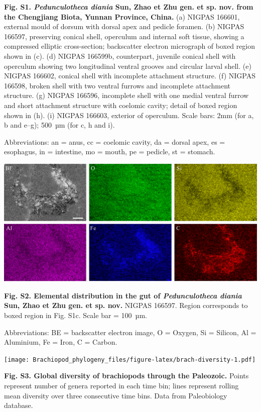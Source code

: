 \documentclass[openany]{book}
\begin{document}
\textbf{Fig. S1. \emph{Pedunculotheca diania} Sun, Zhao et Zhu gen. et
sp. nov. from the Chengjiang Biota, Yunnan Province, China.} (a) NIGPAS
166601, external mould of dorsum with dorsal apex and pedicle foramen.
(b) NIGPAS 166597, preserving conical shell, operculum and internal soft
tissue, showing a compressed elliptic cross-section; backscatter
electron micrograph of boxed region shown in (c). (d) NIGPAS 166599b,
counterpart, juvenile conical shell with operculum showing two
longitudinal ventral grooves and circular larval shell. (e) NIGPAS
166602, conical shell with incomplete attachment structure. (f) NIGPAS
166598, broken shell with two ventral furrows and incomplete attachment
structure. (g) NIGPAS 166596, incomplete shell with one medial ventral
furrow and short attachment structure with coelomic cavity; detail of
boxed region shown in (h). (i) NIGPAS 166603, exterior of operculum.
Scale bars: 2mm (for a, b and e--g); 500~µm (for c, h and i).

Abbreviations: an = anus, cc = coelomic cavity, da = dorsal apex, es =
esophagus, in = intestine, mo = mouth, pe = pedicle, st = stomach.

\clearpage

\begin{center}\includegraphics[width=0.8\linewidth]{images/image2} \end{center}

\textbf{Fig. S2. Elemental distribution in the gut of
\emph{Pedunculotheca diania} Sun, Zhao et Zhu gen. et sp. nov.} NIGPAS
166597. Region corresponds to boxed region in Fig. S1c. Scale bar =
100~µm.

Abbreviations: BE = backscatter electron image, O = Oxygen, Si =
Silicon, Al = Aluminium, Fe = Iron, C = Carbon.

\clearpage

\texttt{[image: Brachiopod\_phylogeny\_files/figure-latex/brach-diversity-1.pdf]}

\textbf{Fig. S3. Global diversity of brachiopods through the Paleozoic.}
Points represent number of genera reported in each time bin; lines
represent rolling mean diversity over three consecutive time bins. Data
from Paleobiology database.
\end{document}
